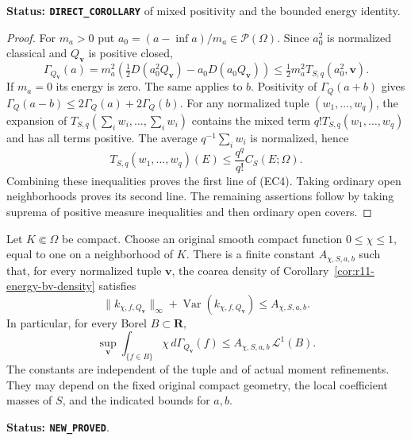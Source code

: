 \noindent\textbf{Status: \texttt{DIRECT\_COROLLARY}} of mixed
positivity and the bounded energy identity.

\begin{proof}
For $m_a>0$ put $a_0=(a-\inf a)/m_a\in\mathcal P(\Omega)$.
Since $a_0^2$ is normalized classical and $Q_{\mathbf v}$ is
positive closed,
\[
 \Gamma_{Q_{\mathbf v}}(a)
  =m_a^2\left(\tfrac12D(a_0^2Q_{\mathbf v})
                              -a_0D(a_0Q_{\mathbf v})\right)
  \le\tfrac12m_a^2T_{S,q}(a_0^2,\mathbf v).
\]
If $m_a=0$ its energy is zero.  The same applies to $b$.
Positivity of $\Gamma_Q(a+b)$ gives
$\Gamma_Q(a-b)\le2\Gamma_Q(a)+2\Gamma_Q(b)$.
For any normalized tuple $(w_1,\ldots,w_q)$, the expansion of
$T_{S,q}(\sum_iw_i,\ldots,\sum_iw_i)$ contains the mixed
term $q!T_{S,q}(w_1,\ldots,w_q)$ and has all terms positive.
The average $q^{-1}\sum_iw_i$ is normalized, hence
\[
 T_{S,q}(w_1,\ldots,w_q)(E)
                         \le\frac{q^q}{q!}C_S(E;\Omega).
\]
Combining these inequalities proves the first line of (EC4).
Taking ordinary open neighborhoods proves its second line.
The remaining assertions follow by taking suprema of positive
measure inequalities and then ordinary open covers.
\end{proof}

\begin{theorem}
\label{thm:r11-uniform-coarea-density}
Let $K\Subset\Omega$ be compact.  Choose an original smooth
compact function $0\le\chi\le1$, equal to one on a neighborhood
of $K$.  There is a finite constant $A_{\chi,S,a,b}$ such that,
for every normalized tuple $\mathbf v$, the coarea density of
Corollary~\ref{cor:r11-energy-bv-density} satisfies
\[
 \|k_{\chi,f,Q_{\mathbf v}}\|_{\infty}
 +\operatorname{Var}(k_{\chi,f,Q_{\mathbf v}})
                                      \le A_{\chi,S,a,b}.
 \tag{EC5}
\]
In particular, for every Borel $B\subset\mathbf R$,
\[
 \sup_{\mathbf v}
  \int_{\{f\in B\}}\chi\,d\Gamma_{Q_{\mathbf v}}(f)
                      \le A_{\chi,S,a,b}\,\mathcal L^1(B).
 \tag{EC6}
\]
The constants are independent of the tuple and of actual
moment refinements.  They may depend on the fixed original
compact geometry, the local coefficient masses of $S$, and
the indicated bounds for $a,b$.
\end{theorem}

\noindent\textbf{Status: \texttt{NEW\_PROVED}}.


